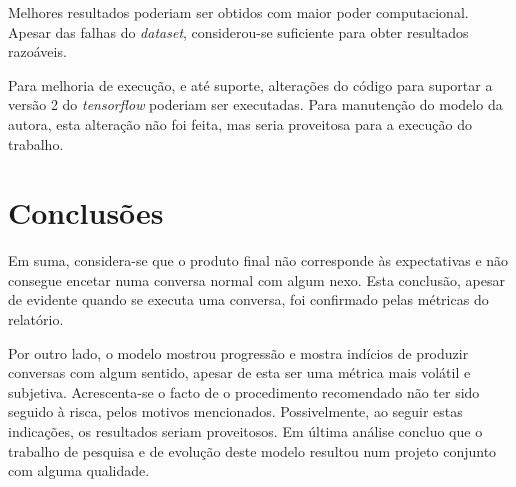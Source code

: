 \documentclass{article}
\begin{document}
Melhores resultados poderiam ser obtidos com maior poder computacional. Apesar das falhas do \textit{dataset}, considerou-se suficiente para obter resultados razoáveis. 

Para melhoria de execução, e até suporte, alterações do código para suportar a versão 2 do \textit{tensorflow} poderiam ser executadas. Para manutenção do modelo da autora, esta alteração não foi feita, mas seria proveitosa para a execução do trabalho.

\section{Conclusões}
Em suma, considera-se que o produto final não corresponde às expectativas e não consegue encetar numa conversa normal com algum nexo. Esta conclusão, apesar de evidente quando se executa uma conversa, foi confirmado pelas métricas do relatório.

Por outro lado, o modelo mostrou progressão e mostra indícios de produzir conversas com algum sentido, apesar de esta ser uma métrica mais volátil e subjetiva. Acrescenta-se o facto de o procedimento recomendado não ter sido seguido à risca, pelos motivos mencionados. Possivelmente, ao seguir estas indicações, os resultados seriam proveitosos. Em última análise concluo que o trabalho de pesquisa e de evolução deste modelo resultou num projeto conjunto com alguma qualidade.




\end{document}
